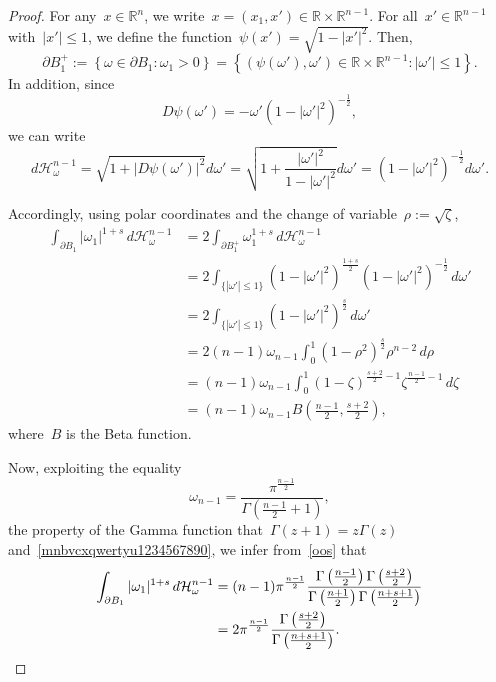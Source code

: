 \documentclass[11pt,hyp,]{nyjm}
\numberwithin{equation}{section}
\newcommand{\R}{\mathbb{R}}
\theoremstyle{remark}
\renewcommand{\leq}{\leqslant}
\renewcommand{\le}{\leqslant}
\begin{document}
\begin{proof}
For any~$x \in \R^n$, we write~$x=(x_1,x') \in\R\times \R^{n-1}$.
For all~$x'\in\R^{n-1}$ with~$|x'|\le1$, we define the function~$
\psi(x')= \sqrt{1- |x'|^2}$.
Then,
\begin{equation*}
\partial B_1^+:= \left\{ \omega \in \partial B_1 : \omega_1>0 \right\}= \left\{ (\psi(\omega'), \omega') \in\R\times\R^{n-1}:|\omega'| \leq 1 \right\}.
\end{equation*}
In addition, since
\begin{equation*}
D\psi (\omega')= - \omega' \left(1-|\omega'|^2\right)^{-\frac{1}{2}},
\end{equation*}
we can write
$$
d\mathcal{H}_{\omega}^{n-1}= \sqrt{1+|D\psi(\omega')|^2} d\omega' = \sqrt{1+\frac{|\omega'|^2}{1-|\omega'|^2}} d\omega' = \left(1-|\omega'|^2\right)^{-\frac{1}{2}} d\omega'.
$$

Accordingly, using polar coordinates and the change of variable~$\rho:= \sqrt{\zeta}$,
\begin{equation}\begin{split}\label{oos}
\int_{\partial B_1} |\omega_1|^{1+s} \, d\mathcal{H}_{\omega}^{n-1} 
&= 2\int_{\partial B_1^+} \omega_1^{1+s} \, d\mathcal{H}_{\omega}^{n-1}
\\&= 2\int_{\{|\omega'| \leq 1 \}} \left(1-|\omega'|^2\right)^{\frac{1+s}{2}} \left(1-|\omega'|^2\right)^{-\frac{1}{2}}\, d\omega' \\&= 2\int_{\{|\omega'| \leq 1 \}}\left(1-|\omega'|^2\right)^{\frac{s}{2}} \, d\omega' 
\\&= 2(n-1)\omega_{n-1} \int_0^1\left(1-\rho^2\right)^{\frac{s}{2}}\rho^{n-2} \, d\rho
\\&=(n-1)\omega_{n-1} \int_0^1 (1-\zeta)^{\frac{s+2}{2}-1} \zeta^{\frac{n-1}{2}-1} \, d\zeta 
\\&= (n-1)\omega_{n-1} B\left(\frac{n-1}{2}, \frac{s+2}{2}\right),
\end{split}\end{equation} where~$B$ is the Beta function.

Now, exploiting the equality
\begin{equation*}
\omega_{n-1}= \displaystyle\frac{\pi^{\frac{n-1}{2}}}{\Gamma\left(\frac{n-1}{2}+1\right)},
\end{equation*}
the property of the Gamma function that~$\Gamma(z+1)= z \Gamma(z)$
and~\eqref{mnbvcxqwertyu1234567890},
we infer from~\eqref{oos} that
\begin{equation*}\begin{split}
\int_{\partial B_1} |\omega_1|^{1+s} \, d\mathcal{H}_{\omega}^{n-1} &= (n-1)\pi^{\frac{n-1}{2}}\frac{\Gamma\left(\frac{n-1}{2}\right)\Gamma\left(\frac{s+2}{2}\right)}{\Gamma\left(\frac{n+1}{2}\right)\Gamma\left(\frac{n+s+1}{2}\right)} 
\\&= 2 \pi^{\frac{n-1}{2}}  \frac{\Gamma\left(\frac{s+2}{2}\right)}{\Gamma\left(\frac{n+s+1}{2}\right)}. \qedhere\end{split}
\end{equation*}
\end{proof}
\end{document}
